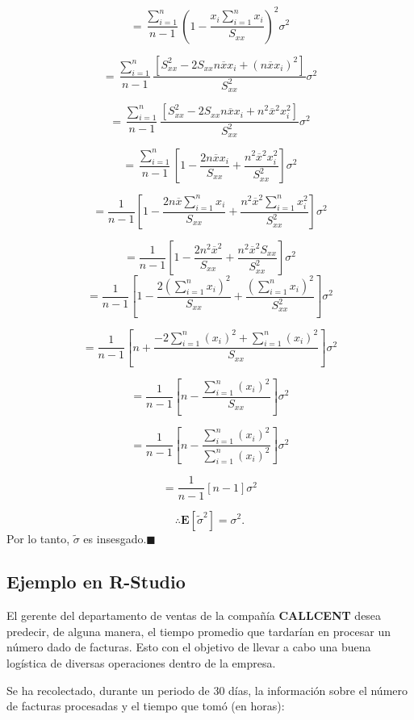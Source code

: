 \documentclass[
  a4paper,
  oneside,
  openany]{book}
\begin{document}
\[=\frac{\sum_{i=1}^{n}}{n-1}\left(1-\frac{x_{i}\sum_{i=1}^{n}x_{i}}{S_{xx}}\right)^2\sigma^2\]

\[=\frac{\sum_{i=1}^{n}}{n-1}\frac{[S_{xx}^2-2S_{xx}n\overline{x}x_{i}+(n\overline{x}x_{i})^2]}{S_{xx}^2}\sigma^2\]

\[=\frac{\sum_{i=1}^{n}}{n-1}\frac{[S_{xx}^2-2S_{xx}n\overline{x}x_{i}+n^2\overline{x}^2x_{i}^2]}{S_{xx}^2}\sigma^2\]

\[=\frac{\sum_{i=1}^{n}}{n-1}\left[ 1-\frac{2n\overline{x}x_{i}}{S_{xx}}+\frac{n^2\overline{x}^2x_{i}^2}{S_{xx}^2}\right]\sigma^2\]

\[=\frac{1}{n-1}\left[ 1-\frac{2n\overline{x}\sum_{i=1}^{n}x_{i}}{S_{xx}}+\frac{n^2\overline{x}^2\sum_{i=1}^{n}x_{i}^2}{S_{xx}^2}\right]\sigma^2\]

\[=\frac{1}{n-1}\left[ 1-\frac{2n^2\overline{x}^2}{S_{xx}}+\frac{n^2\overline{x}^2S_{xx}}{S_{xx}^2}\right]\sigma^2\]
\[=\frac{1}{n-1}\left[ 1-\frac{2(\sum_{i=1 }^{n}x_{i})^2}{S_{xx}}+\frac{(\sum_{i=1}^{n}x_{i})^2}{S_{xx}^2}\right]\sigma^2\]

\[=\frac{1}{n-1}\left[ n+\frac{-2\sum_{i=1 }^{n}(x_{i})^2+\sum_{i=1}^{n}(x_{i})^2}{S_{xx}}\right]\sigma^2\]

\[=\frac{1}{n-1}\left[ n-\frac{\sum_{i=1 }^{n}(x_{i})^2}{S_{xx}}\right]\sigma^2\]

\[=\frac{1}{n-1}\left[ n-\frac{\sum_{i=1 }^{n}(x_{i})^2}{\sum_{i=1 }^{n}(x_{i})^2}\right]\sigma^2\]

\[=\frac{1}{n-1}\left[ n-1\right]\sigma^2\]

\[ \therefore \mathbf{E}[\tilde{\sigma}^2]=\sigma^2.\]
Por lo tanto, \(\tilde{\sigma}\) es insesgado.\(\blacksquare\)

\hypertarget{ejemplo-en-r-studio-18}{%
\subsection{Ejemplo en R-Studio}\label{ejemplo-en-r-studio-18}}

El gerente del departamento de ventas de la compañía \textbf{CALLCENT} desea predecir, de alguna manera, el tiempo promedio que tardarían en procesar un número dado de facturas. Esto con el objetivo de llevar a cabo una buena logística de diversas operaciones dentro de la empresa.

Se ha recolectado, durante un periodo de 30 días, la información sobre el número de facturas procesadas y el tiempo que tomó (en horas):
\end{document}

